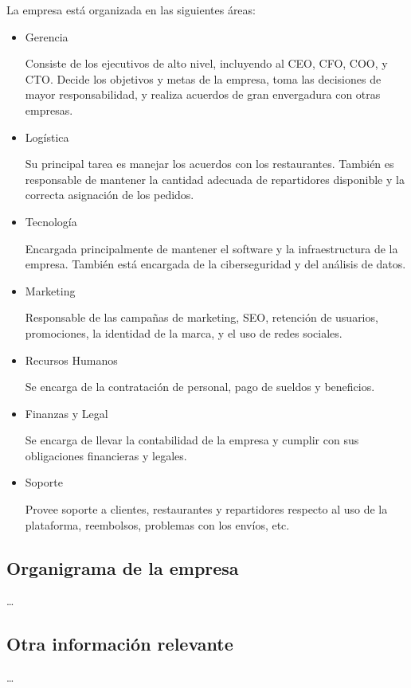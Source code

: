 La empresa está organizada en las siguientes áreas:

\begin{itemize}
    \item Gerencia
    
    Consiste de los ejecutivos de alto nivel, incluyendo al CEO, CFO, COO, y CTO. Decide los objetivos y metas de la empresa, toma las decisiones de mayor responsabilidad, y realiza acuerdos de gran envergadura con otras empresas.

    \item Logística
    
    Su principal tarea es manejar los acuerdos con los restaurantes. También es responsable de mantener la cantidad adecuada de repartidores disponible y la correcta asignación de los pedidos.
    
    \item Tecnología
    
    Encargada principalmente de mantener el software y la infraestructura de la empresa. También está encargada de la ciberseguridad y del análisis de datos.

    \item Marketing
    
    Responsable de las campañas de marketing, SEO, retención de usuarios, promociones, la identidad de la marca, y el uso de redes sociales.

    \item Recursos Humanos
    
    Se encarga de la contratación de personal, pago de sueldos y beneficios.

    \item Finanzas y Legal
    
    Se encarga de llevar la contabilidad de la empresa y cumplir con sus obligaciones financieras y legales.

    \item Soporte
    
    Provee soporte a clientes, restaurantes y repartidores respecto al uso de la plataforma, reembolsos, problemas con los envíos, etc.
\end{itemize}

\subsection{Organigrama de la empresa}

\dots

\subsection{Otra información relevante}

\dots
